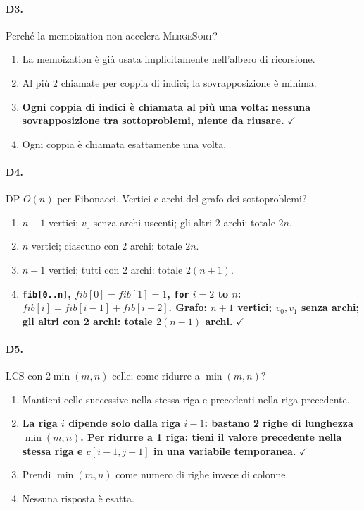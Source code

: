 \paragraph{D3.} Perch\'e la memoization non accelera \textsc{MergeSort}?
\begin{enumerate}[label=\Alph*.,leftmargin=*]
	\item La memoization \`e gi\`a usata implicitamente nell'albero di ricorsione.
	\item Al pi\`u 2 chiamate per coppia di indici; la sovrapposizione \`e minima.
	\item \textcolor{correctgreen}{\textbf{Ogni coppia di indici \`e chiamata al pi\`u una volta: nessuna sovrapposizione tra sottoproblemi, niente da riusare.}} \hfill\textcolor{correctgreen}{$\checkmark$}
	\item Ogni coppia \`e chiamata esattamente una volta.
\end{enumerate}

\paragraph{D4.} DP $O(n)$ per Fibonacci. Vertici e archi del grafo dei sottoproblemi?
\begin{enumerate}[label=\Alph*.,leftmargin=*]
	\item $n+1$ vertici; $v_0$ senza archi uscenti; gli altri 2 archi: totale $2n$.
	\item $n$ vertici; ciascuno con 2 archi: totale $2n$.
	\item $n+1$ vertici; tutti con 2 archi: totale $2(n+1)$.
	\item \textcolor{correctgreen}{\textbf{\texttt{fib[0..n]}, $\mathit{fib}[0]=\mathit{fib}[1]=1$, \texttt{for} $i=2$ to $n$: $\mathit{fib}[i]=\mathit{fib}[i-1]+\mathit{fib}[i-2]$. Grafo: $n+1$ vertici; $v_0,v_1$ senza archi; gli altri con 2 archi: totale $2(n-1)$ archi.}} \hfill\textcolor{correctgreen}{$\checkmark$}
\end{enumerate}

\paragraph{D5.} LCS con $2\min(m,n)$ celle; come ridurre a $\min(m,n)$?
\begin{enumerate}[label=\Alph*.,leftmargin=*]
	\item Mantieni celle successive nella stessa riga e precedenti nella riga precedente.
	\item \textcolor{correctgreen}{\textbf{La riga $i$ dipende solo dalla riga $i-1$: bastano 2 righe di lunghezza $\min(m,n)$. Per ridurre a 1 riga: tieni il valore precedente nella stessa riga e $c[i-1,j-1]$ in una variabile temporanea.}} \hfill\textcolor{correctgreen}{$\checkmark$}
	\item Prendi $\min(m,n)$ come numero di righe invece di colonne.
	\item Nessuna risposta \`e esatta.
\end{enumerate}

